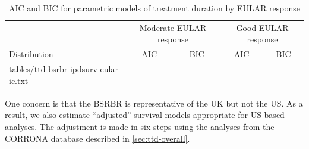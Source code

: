\documentclass[11pt,final,fleqn]{article}\usepackage[]{graphicx}\usepackage[]{color}
\makeatletter
\theoremstyle{plain}
\newcommand*\ExpandableInput[1]{\@@input#1 }
\makeatother
\begin{document}
\begin{table}[!ht]
\begin{center}
\begin{threeparttable}
\caption{AIC and BIC for parametric models of treatment duration by EULAR response} \label{tbl:ic-dur-eular}
\begin{tabularx}{\textwidth}{@{\extracolsep{\fill}}lcccc}
\hline
\multicolumn{1}{l}{} & \multicolumn{2}{c}{Moderate EULAR response} & \multicolumn{2}{c}{Good EULAR response} \\
\cmidrule{2-3} \cmidrule{4-5}
\multicolumn{1}{l}{Distribution} & \multicolumn{1}{c}{AIC} & \multicolumn{1}{c}{BIC} & \multicolumn{1}{c}{AIC}  & \multicolumn{1}{c}{BIC}   \\
\hline
\ExpandableInput{tables/ttd-bsrbr-ipdsurv-eular-ic.txt}
\hline
\end{tabularx}
\end{threeparttable}
\end{center}
\end{table}

One concern is that the BSRBR is representative of the UK but not the US. As a result, we also estimate ``adjusted'' survival models appropriate for US based analyses. The adjustment is made in six steps using the analyses from the CORRONA database described in \autoref{sec:ttd-overall}. 
\end{document}

